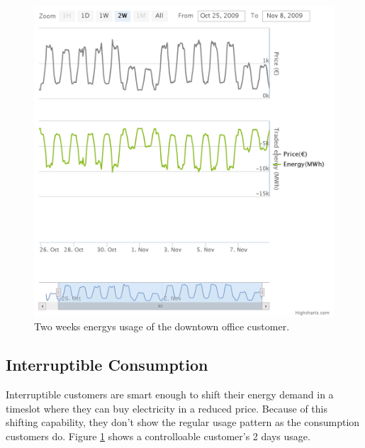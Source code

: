 \begin{figure}[h!]
  \includegraphics[width=\linewidth]{downtown-offc-2-weeks.png}
  \caption{Two weeks energys usage of the downtown office customer.}
  \label{fig:2weekOffice}
\end{figure}

\subsection{Interruptible Consumption}
Interruptible customers are smart enough to shift their energy demand in a timeslot where they can buy electricity in a reduced price. Because of this shifting capability, they don't show the regular usage pattern as the consumption customers do. Figure \ref{fig:2weekOffice} shows a controlloable customer's 2 days usage.

